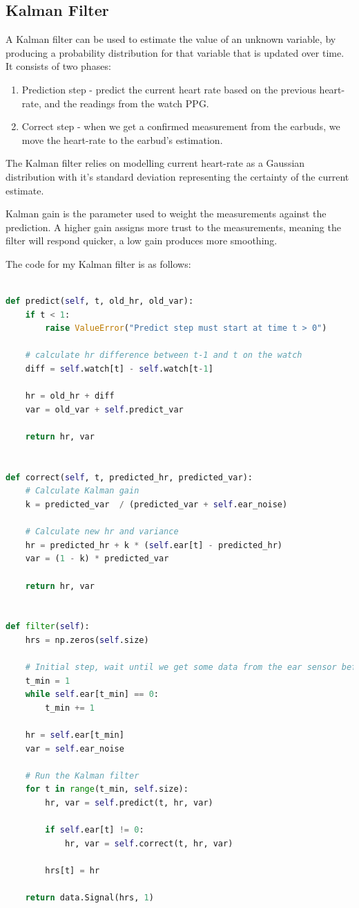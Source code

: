 \documentclass[12pt,a4paper,twoside,openright]{report}
\begin{document}
\subsection{Kalman Filter}

A Kalman filter can be used to estimate the value of an unknown variable, by
producing a probability distribution for that variable that is updated over
time.
It consists of two phases:
\begin{enumerate}
	\item Prediction step - predict the current heart rate based on the
		previous heart-rate, and the readings from the watch PPG.

	\item Correct step - when we get a confirmed measurement from the
		earbuds, we move the heart-rate to the earbud's estimation.
\end{enumerate}

The Kalman filter relies on modelling current heart-rate as a Gaussian
distribution with it's standard deviation representing the certainty of the
current estimate.

Kalman gain is the parameter used to weight the measurements against the
prediction. A higher gain assigns more trust to the measurements, meaning the
filter will respond quicker, a low gain produces more smoothing.

The code for my Kalman filter is as follows:


\begin{lstlisting}[language=Python]

def predict(self, t, old_hr, old_var):
    if t < 1:
        raise ValueError("Predict step must start at time t > 0")

    # calculate hr difference between t-1 and t on the watch
    diff = self.watch[t] - self.watch[t-1]

    hr = old_hr + diff
    var = old_var + self.predict_var

    return hr, var


def correct(self, t, predicted_hr, predicted_var):
    # Calculate Kalman gain
    k = predicted_var  / (predicted_var + self.ear_noise)

    # Calculate new hr and variance
    hr = predicted_hr + k * (self.ear[t] - predicted_hr)
    var = (1 - k) * predicted_var

    return hr, var


def filter(self):
    hrs = np.zeros(self.size)

    # Initial step, wait until we get some data from the ear sensor before starting the filter
    t_min = 1
    while self.ear[t_min] == 0:
        t_min += 1

    hr = self.ear[t_min]
    var = self.ear_noise

    # Run the Kalman filter
    for t in range(t_min, self.size):
        hr, var = self.predict(t, hr, var)

        if self.ear[t] != 0:
            hr, var = self.correct(t, hr, var)

        hrs[t] = hr

    return data.Signal(hrs, 1)

\end{lstlisting}
\end{document}
